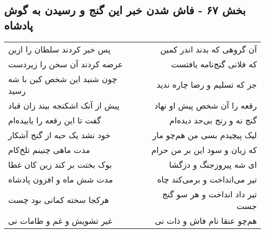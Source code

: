 \begin{center}
\section*{بخش ۶۷ - فاش شدن خبر این گنج و رسیدن به گوش پادشاه}
\label{sec:sh067}
\begin{longtable}{l p{0.5cm} r}
پس خبر کردند سلطان را ازین
&&
آن گروهی که بدند اندر کمین
\\
عرضه کردند آن سخن را زیردست
&&
که فلانی گنج‌نامه یافتست
\\
چون شنید این شخص کین با شه رسید
&&
جز که تسلیم و رضا چاره ندید
\\
پیش از آنک اشکنجه بیند زان قباد
&&
رقعه را آن شخص پیش او نهاد
\\
گفت تا این رقعه را یابیده‌ام
&&
گنج نه و رنج بی‌حد دیده‌ام
\\
خود نشد یک حبه از گنج آشکار
&&
لیک پیچیدم بسی من هم‌چو مار
\\
مدت ماهی چنینم تلخ‌کام
&&
که زیان و سود این بر من حرام
\\
بوک بختت بر کند زین کان غطا
&&
ای شه پیروزجنگ و دزگشا
\\
مدت شش ماه و افزون پادشاه
&&
تیر می‌انداخت و برمی‌کند چاه
\\
هرکجا سخته کمانی بود چست
&&
تیر داد انداخت و هر سو گنج جست
\\
غیر تشویش و غم و طامات نی
&&
هم‌چو عنقا نام فاش و ذات نی
\\
\end{longtable}
\end{center}

